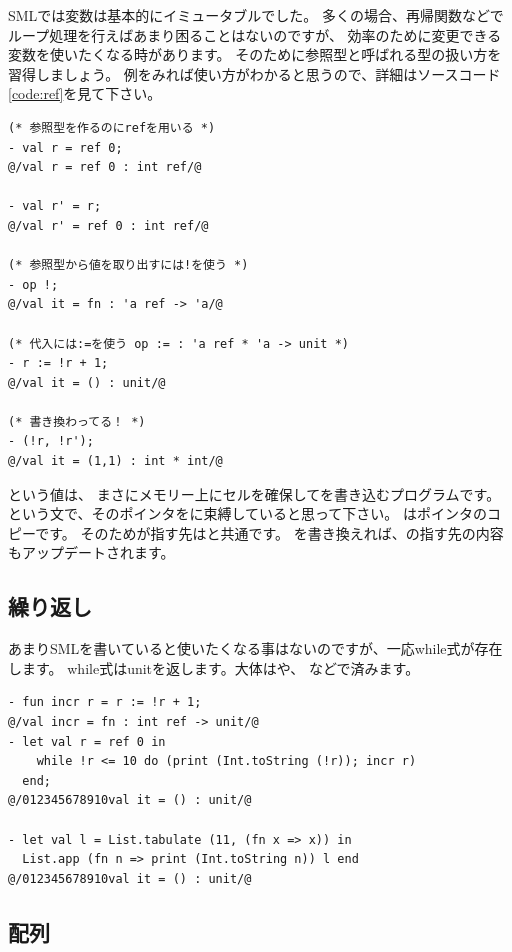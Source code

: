 \documentclass[11pt,a4paper]{article}
\begin{document}
SMLでは変数は基本的にイミュータブルでした。
多くの場合、再帰関数などでループ処理を行えばあまり困ることはないのですが、
効率のために変更できる変数を使いたくなる時があります。
そのために参照型と呼ばれる型の扱い方を習得しましょう。
例をみれば使い方がわかると思うので、詳細はソースコード\ref{code:ref}を見て下さい。

\begin{lstlisting}[caption=ref型,label=code:ref]
(* 参照型を作るのにrefを用いる *)
- val r = ref 0;
@/val r = ref 0 : int ref/@

- val r' = r;
@/val r' = ref 0 : int ref/@

(* 参照型から値を取り出すには!を使う *)
- op !;
@/val it = fn : 'a ref -> 'a/@

(* 代入には:=を使う op := : 'a ref * 'a -> unit *)
- r := !r + 1;
@/val it = () : unit/@

(* 書き換わってる！ *)
- (!r, !r');
@/val it = (1,1) : int * int/@
\end{lstlisting}

という値は、
まさにメモリー上にセルを確保してを書き込むプログラムです。
という文で、そのポインタをに束縛していると思って下さい。
はポインタのコピーです。
そのためが指す先はと共通です。
を書き換えれば、の指す先の内容もアップデートされます。

\subsection{繰り返し}

あまりSMLを書いていると使いたくなる事はないのですが、一応while式が存在します。
while式はunitを返します。大体はや、
などで済みます。

\begin{lstlisting}[caption=while式,label=code:while]
- fun incr r = r := !r + 1;
@/val incr = fn : int ref -> unit/@
- let val r = ref 0 in
    while !r <= 10 do (print (Int.toString (!r)); incr r)
  end;
@/012345678910val it = () : unit/@

- let val l = List.tabulate (11, (fn x => x)) in
  List.app (fn n => print (Int.toString n)) l end
@/012345678910val it = () : unit/@
\end{lstlisting}

\subsection{配列}
\end{document}
